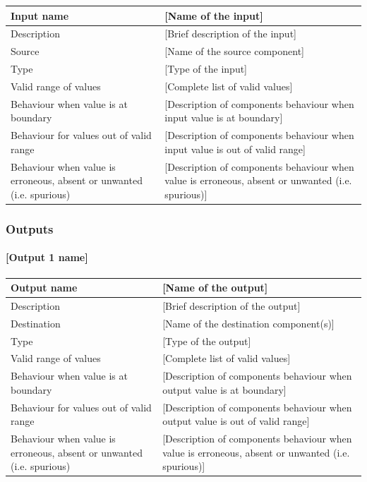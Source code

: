 \begin{longtable}{p{}p{}}
\toprule
Input name				& [Name of the input] \\
\midrule
Description				& [Brief description of the input] \\
\midrule
Source					& [Name of the source component] \\ 
\midrule
Type					& [Type of the input] \\
\midrule
Valid range of values	& [Complete list of valid values] \\
\midrule
Behaviour when value is at boundary	& [Description of components behaviour when input value is at boundary] \\
\midrule
Behaviour for values out of valid range	& [Description of components behaviour when input value is out of valid range] \\
\midrule
Behaviour when value is erroneous, absent or unwanted (i.e. spurious) & [Description of components behaviour when value is erroneous, absent or unwanted (i.e. spurious)] \\
\bottomrule
\end{longtable}

\subsubsection{Outputs}\label{s:mode_and_level_outputs}

\paragraph{[Output 1 name]}

\begin{longtable}{p{}p{}}
\toprule
Output name				& [Name of the output] \\
\midrule
Description				& [Brief description of the output] \\
\midrule
Destination				& [Name of the destination component(s)] \\ 
\midrule
Type					& [Type of the output] \\
\midrule
Valid range of values	& [Complete list of valid values] \\
\midrule
Behaviour when value is at boundary	& [Description of components behaviour when output value is at boundary] \\
\midrule
Behaviour for values out of valid range	& [Description of components behaviour when output value is out of valid range] \\
\midrule
Behaviour when value is erroneous, absent or unwanted (i.e. spurious) & [Description of components behaviour when value is erroneous, absent or unwanted (i.e. spurious)] \\
\bottomrule
\end{longtable}


